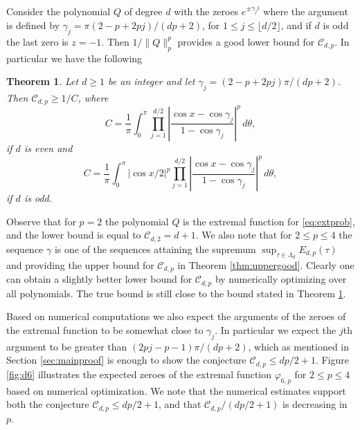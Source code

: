 \documentclass{amsart}
\theoremstyle{plain}
\newtheorem{theorem}{Theorem}
\theoremstyle{remark}
\begin{document}
	Consider the polynomial $Q$ of degree $d$ with the zeroes $e^{\pm \gamma_j i}$ where the argument is defined by $\gamma_j=\pi(2-p+2pj)/(dp+2)$, for $1 \leq j \leq \lfloor d/2 \rfloor$, and if $d$ is odd the last zero is $z=-1$. Then $1/\|Q\|_p^p$ provides a good lower bound for $\mathscr{C}_{d,p}$. In particular we have the following
	
	\begin{theorem}\label{thm:plowergen}
		Let $d \geq 1$ be an integer and let $\gamma_j=(2-p+2pj)\pi/(dp+2)$. Then  $\mathscr{C}_{d,p} \geq 1/C$, where
		\[C=\frac{1}{\pi}\int_{0}^{\pi} \prod_{j=1}^{d/2} \left|\frac{\cos x - \cos \gamma_j}{1-\cos \gamma_j} \right|^p \, d\theta,\]
		if $d$ is even and
		\[C=\frac{1}{\pi}\int_{0}^{\pi} |\cos x/2|^p \prod_{j=1}^{d/2} \left|\frac{\cos x - \cos \gamma_j}{1-\cos \gamma_j}\right|^p \, d\theta,\]
		if $d$ is odd.
	\end{theorem}	
	
	Observe that for $p=2$ the polynomial $Q$ is the extremal function for \eqref{eq:extprob}, and the lower bound is equal to $\mathscr{C}_{d,2}=d+1$. We also note that for $2 \leq p \leq 4$ the sequence $\gamma$ is one of the sequences attaining the supremum $\sup_{\tau \in \Lambda_d} E_{d,p}(\tau)$ and providing the upper bound for $\mathscr{C}_{d,p}$ in Theorem \ref{thm:uppergood}. Clearly one can obtain a slightly better lower bound for $\mathscr{C}_{d,p}$ by numerically optimizing over all polynomials. The true bound is still close to the bound stated in Theorem \ref{thm:plowergen}.
	
	Based on numerical computations we also expect the arguments of the zeroes of the extremal function to be somewhat close to $\gamma_j$. In particular we expect the $j$th argument to be greater than $ (2pj-p-1)\pi/(dp+2)$, which as mentioned in Section \ref{sec:mainproof} is enough to show the conjecture $\mathscr{C}_{d,p} \leq dp/2+1$. Figure \ref{fig:d6} illustrates the expected zeroes of the extremal function $\varphi_{6,p}$ for $2 \leq p \leq 4$ based on numerical optimization. We note that the numerical estimates support both the conjecture $\mathscr{C}_{d,p} \leq dp/2+1$, and that $\mathscr{C}_{d,p}/(dp/2+1)$ is decreasing in $p$. 
	 
	 
	\appendix
\end{document}
